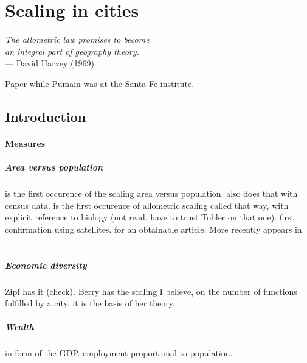%
\chapter{Scaling in cities}
\label{sec:scaling_in_cities}

\begin{flushright}{\slshape    
The allometric law promises to become\\
an integral part of geography theory.} \\ \medskip
--- David Harvey (1969)~\cite{Harvey:1969} 
\end{flushright}

\cite{Pumain:2004} Paper while Pumain was at the Santa Fe institute.

\section{Introduction}
\label{sec:introduction}

    \subsubsection{Measures}
    \label{ssub:measures}

\paragraph{Area versus population} \cite{Stewart:1958} is the first occurence of
the scaling area versus population. \cite{Boyce:1963} also does that with census
data. \cite{Nordbeck:1965} is the first occurence
of allometric scaling called that way, with explicit reference to biology (not
read, have to trust Tobler on that one).
\cite{Tobler:1969} first confirmation using satellites. \cite{Nordbeck:1971} for
an obtainable article. More recently appears in ~\cite{Guerois:2003}.

\paragraph{Economic diversity} \cite{Zipf:1949} Zipf has it (check). \cite{Berry:1967} Berry has the scaling I
believe, on the number of functions fulfilled by a city. \cite{Pumain:2006} it
is the basis of her theory. \cite{Bettencourt:2014}

\paragraph{Wealth} \cite{Bettencourt:2007} in form of the GDP.
\cite{Bettencourt:2014} employment proportional to population.

